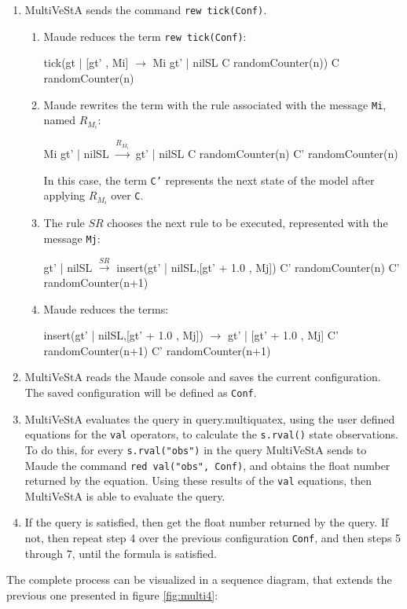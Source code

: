 \begin{enumerate}
\item MultiVeStA sends the command \texttt{rew tick(Conf)}.
    \begin{enumerate}
        \item Maude reduces the term \texttt{rew tick(Conf)}:
        \begin{maude}

tick({gt | [gt' , Mi]}     $\rightarrow$  Mi {gt' | nilSL }
     {C randomCounter(n)})    {C randomCounter(n)}\end{maude}
        \item Maude rewrites the term with the rule associated with the message \texttt{Mi}, named $R_{M_i}$:
        \begin{maude}
        
Mi {gt' | nilSL}    $\xrightarrow{R_{M_i}}$ {gt' | nilSL }
{C randomCounter(n)}     {C'  randomCounter(n)}
        \end{maude}
        In this case, the term \texttt{C'} represents the next state of the model after applying $R_{M_i}$ over \texttt{C}.
        \item The rule $SR$ chooses the next rule to be executed, represented with the message \texttt{Mj}:
        \begin{maude}

{gt' | nilSL }        $\xrightarrow{SR}$   insert({gt' | nilSL},[gt' + 1.0 , Mj])
{C' randomCounter(n)}       {C' randomCounter(n+1)}\end{maude}
        
        \item Maude reduces the terms:
        \begin{maude}
        
insert({gt' | nilSL},[gt' + 1.0 , Mj]) $\rightarrow$ {gt' | [gt' + 1.0 , Mj]} 
{C' randomCounter(n+1)}                   {C' randomCounter(n+1)}\end{maude}
    \end{enumerate}

    \item MultiVeStA reads the Maude console and saves the current configuration. The saved configuration will be defined as \texttt{Conf}.

    \item MultiVeStA evaluates the query in query.multiquatex, using the user defined equations for the \texttt{val} operators, to calculate the \texttt{s.rval()} state observations. To do this, for every \texttt{s.rval("obs")} in the query MultiVeStA sends to Maude the command \texttt{red val("obs", Conf)}, and obtains the float number returned by the equation. Using these results of the \texttt{val} equations, then MultiVeStA is able to evaluate the query.
    
    \item If the query is satisfied, then get the float number returned by the query. If not, then repeat step 4 over the previous configuration \texttt{Conf}, and then steps 5 through 7, until the formula is satisfied.
\end{enumerate}
The complete process can be visualized in a sequence diagram, that extends the previous one presented in figure \ref{fig:multi4}:


